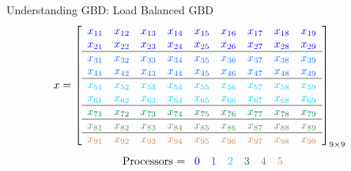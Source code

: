 \begin{frame}
\begin{exampleblock}{Understanding GBD:  Load Balanced GBD}
\begin{align*}
x &= \left[
      \begin{array}{lllllllll}
      \color{g11}x_{11} & \color{g11}x_{12} & \color{g11}x_{13} & \color{g11}x_{14} & 
\color{g11}x_{15} & \color{g11}x_{16} & \color{g11}x_{17} & \color{g11}x_{18} & \color{g11}x_{19}\\
      \color{g11}x_{21} & \color{g11}x_{22} & \color{g11}x_{23} & \color{g11}x_{24} & 
\color{g11}x_{25} & \color{g11}x_{26} & \color{g11}x_{27} & \color{g11}x_{28} & 
\color{g11}x_{29}\\\hline
      \color{g12}x_{31} & \color{g12}x_{32} & \color{g12}x_{33} & \color{g12}x_{34} & 
\color{g12}x_{35} & \color{g12}x_{36} & \color{g12}x_{37} & \color{g12}x_{38} & \color{g12}x_{39}\\
      \color{g12}x_{41} & \color{g12}x_{42} & \color{g12}x_{43} & \color{g12}x_{44} & 
\color{g12}x_{45} & \color{g12}x_{46} & \color{g12}x_{47} & \color{g12}x_{48} & 
\color{g12}x_{49}\\\hline
      \color{g13}x_{51} & \color{g13}x_{52} & \color{g13}x_{53} & \color{g13}x_{54} & 
\color{g13}x_{55} & \color{g13}x_{56} & \color{g13}x_{57} & \color{g13}x_{58} & \color{g13}x_{59}\\
      \color{g13}x_{61} & \color{g13}x_{62} & \color{g13}x_{63} & \color{g13}x_{64} & 
\color{g13}x_{65} & \color{g13}x_{66} & \color{g13}x_{67} & \color{g13}x_{68} & 
\color{g13}x_{69}\\\hline
      \color{g21}x_{71} & \color{g21}x_{72} & \color{g21}x_{73} & \color{g21}x_{74} & 
\color{g21}x_{75} & \color{g21}x_{76} & \color{g21}x_{77} & \color{g21}x_{78} & 
\color{g21}x_{79}\\\hline
      \color{g22}x_{81} & \color{g22}x_{82} & \color{g22}x_{83} & \color{g22}x_{84} & 
\color{g22}x_{85} & \color{g22}x_{86} & \color{g22}x_{87} & \color{g22}x_{88} & 
\color{g22}x_{89}\\\hline
      \color{g23}x_{91} & \color{g23}x_{92} & \color{g23}x_{93} & \color{g23}x_{94} & 
\color{g23}x_{95} & \color{g23}x_{96} & \color{g23}x_{97} & \color{g23}x_{98} & \color{g23}x_{99}\\
      \end{array}
\right]_{9\times 9}
\end{align*}
\begin{align*}
\text{Processors = }
      \begin{array}{llllll}
      \color{g11}0 & \color{g12}1 & \color{g13}2 & \color{g21}3 & \color{g22}4 & \color{g23}5
      \end{array}
\end{align*}
\end{exampleblock}
\end{frame}

